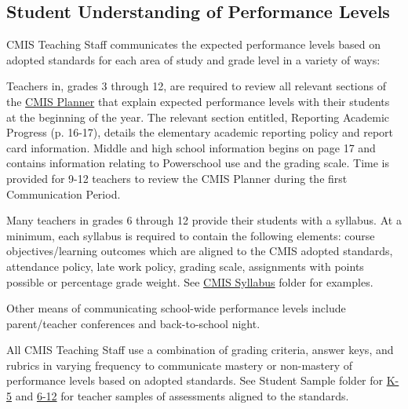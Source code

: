 \subsection{Student Understanding of Performance Levels}



\begin{findings}
CMIS Teaching Staff communicates the expected performance levels based on adopted standards for each area of study and grade level in a variety of ways:


Teachers in, grades 3 through 12, are required to review all relevant sections of the \href{https://drive.google.com/file/d/0B8vOjwyFoCioQ2tNak04WGd3Mm8/view?usp=sharing}{CMIS Planner} that explain expected performance levels with their students at the beginning of the year. The relevant section entitled, Reporting Academic Progress (p. 16-17), details the elementary academic reporting policy and report card information. Middle and high school information begins on page 17 and contains information relating to Powerschool use and the grading scale. Time is provided for 9-12 teachers to review the CMIS Planner during the first Communication Period. 


Many teachers in grades 6 through 12 provide their students with a syllabus. At a minimum, each syllabus is required to contain the following elements: course objectives/learning outcomes which are aligned to the CMIS adopted standards, attendance policy, late work policy, grading scale, assignments with points possible or percentage grade weight. See \href{https://drive.google.com/drive/folders/0ByVFfrm0zfolNmdnMzU2S2xRSWs?usp=sharing}{CMIS Syllabus} folder for examples. 

Other means of communicating school-wide performance levels include parent/teacher conferences and back-to-school night.  


All CMIS Teaching Staff use a combination of grading criteria, answer keys, and rubrics in varying frequency to communicate mastery or non-mastery of performance levels based on adopted standards. See Student Sample folder for \href{https://drive.google.com/drive/folders/0ByVFfrm0zfolVGJzdXpvLV9reVk?usp=sharing}{K-5} and  \href{https://drive.google.com/drive/folders/0ByVFfrm0zfolMkF5aThoSzZxa1E?usp=sharing}{6-12} for teacher samples of assessments aligned to the standards. 


\end{findings}
